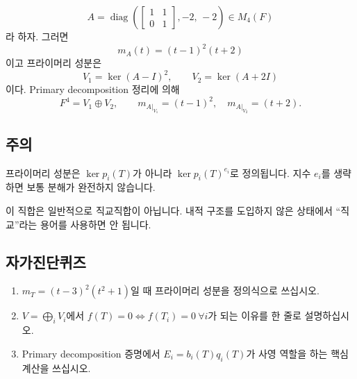 \begin{example}
\[
A=\operatorname{diag}\!\left(
\begin{bmatrix}1&1\\0&1\end{bmatrix},
-2,\,-2
\right)\in M_4(F)
\]
라 하자. 그러면
\[
m_A(t)=(t-1)^2(t+2)
\]
이고 프라이머리 성분은
\[
V_1=\ker(A-I)^2,\qquad V_2=\ker(A+2I)
\]
이다. Primary decomposition 정리에 의해
\[
F^4=V_1\oplus V_2,\qquad
m_{A|_{V_1}}=(t-1)^2,\quad m_{A|_{V_2}}=(t+2).
\]
\end{example}

\subsection*{주의}
\begin{warning}
프라이머리 성분은 $\ker p_i(T)$가 아니라 $\ker p_i(T)^{e_i}$로 정의됩니다. 지수 $e_i$를 생략하면 보통 분해가 완전하지 않습니다.
\end{warning}
\begin{warning}
이 직합은 일반적으로 직교직합이 아닙니다. 내적 구조를 도입하지 않은 상태에서 ``직교''라는 용어를 사용하면 안 됩니다.
\end{warning}

\subsection*{자가진단퀴즈}
\begin{enumerate}[label=\arabic*.]
\item $m_T=(t-3)^2(t^2+1)$일 때 프라이머리 성분을 정의식으로 쓰십시오.
\item $V=\bigoplus_i V_i$에서 $f(T)=0\iff f(T_i)=0\ \forall i$가 되는 이유를 한 줄로 설명하십시오.
\item Primary decomposition 증명에서 $E_i=\!b_i(T)q_i(T)$가 사영 역할을 하는 핵심 계산을 쓰십시오.
\end{enumerate}



